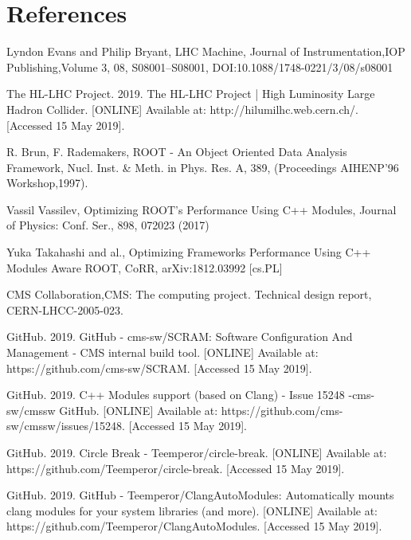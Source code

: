 \documentclass[12pt]{iopart}
\begin{document}
\section*{References}

\begin{thebibliography}{10}

Lyndon Evans and Philip Bryant, LHC Machine, Journal of Instrumentation,IOP Publishing,Volume 3, 08, S08001--S08001, DOI:10.1088/1748-0221/3/08/s08001

The HL-LHC Project. 2019. The HL-LHC Project | High Luminosity Large Hadron Collider. [ONLINE] Available at: http://hilumilhc.web.cern.ch/. [Accessed 15 May 2019]. 

R. Brun, F. Rademakers, ROOT - An Object Oriented Data Analysis Framework, Nucl. Inst. \& Meth. in Phys. Res. A, 389, (Proceedings AIHENP'96 Workshop,1997).

Vassil Vassilev, Optimizing ROOT's Performance Using C++ Modules, Journal of Physics: Conf. Ser., 898, 072023 (2017)

Yuka Takahashi and al., Optimizing Frameworks Performance Using C++ Modules Aware ROOT, CoRR, arXiv:1812.03992 [cs.PL]

CMS Collaboration,CMS: The computing project. Technical design report, CERN-LHCC-2005-023.

GitHub. 2019. GitHub - cms-sw/SCRAM: Software Configuration And Management - CMS internal build tool. [ONLINE] Available at: https://github.com/cms-sw/SCRAM. [Accessed 15 May 2019]. 

GitHub. 2019. C++ Modules support (based on Clang) - Issue 15248 -cms-sw/cmssw GitHub. [ONLINE] Available at: https://github.com/cms-sw/cmssw/issues/15248. [Accessed 15 May 2019]. 

GitHub. 2019. Circle Break - Teemperor/circle-break. [ONLINE] Available at: https://github.com/Teemperor/circle-break. [Accessed 15 May 2019]. 

GitHub. 2019. GitHub - Teemperor/ClangAutoModules: Automatically mounts clang modules for your system libraries (and more). [ONLINE] Available at: https://github.com/Teemperor/ClangAutoModules. [Accessed 15 May 2019]. 

\end{thebibliography}
\end{document}
